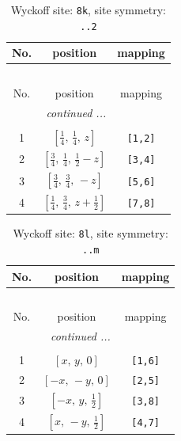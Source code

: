 \documentclass[fleqn,8pt]{jsarticle}
\begin{document}
\renewcommand{\arraystretch}{1.2}
\begin{longtable}{ccc}
\caption{Wyckoff site: {\tt 8k}, site symmetry: {\tt ..2}}
 \\
 \hline \hline
No. & position & mapping \\ \hline \endfirsthead

\multicolumn{2}{l}{\tablename\ \thetable{}} \\
 \hline \hline
No. & position & mapping \\ \hline \endhead

 \hline \hline
\multicolumn{2}{r}{\footnotesize\it continued ...} \\ \endfoot

 \hline \hline
\multicolumn{2}{r}{} \\ \endlastfoot

1 & $\left[ \frac{1}{4},\, \frac{1}{4},\, z \right]$ & {\tt [1,2]} \\ \hline
2 & $\left[ \frac{3}{4},\, \frac{1}{4},\, \frac{1}{2} - z \right]$ & {\tt [3,4]} \\ \hline
3 & $\left[ \frac{3}{4},\, \frac{3}{4},\, - z \right]$ & {\tt [5,6]} \\ \hline
4 & $\left[ \frac{1}{4},\, \frac{3}{4},\, z + \frac{1}{2} \right]$ & {\tt [7,8]} \\
\end{longtable}
\renewcommand{\arraystretch}{1.2}
\begin{longtable}{ccc}
\caption{Wyckoff site: {\tt 8l}, site symmetry: {\tt ..m}}
 \\
 \hline \hline
No. & position & mapping \\ \hline \endfirsthead

\multicolumn{2}{l}{\tablename\ \thetable{}} \\
 \hline \hline
No. & position & mapping \\ \hline \endhead

 \hline \hline
\multicolumn{2}{r}{\footnotesize\it continued ...} \\ \endfoot

 \hline \hline
\multicolumn{2}{r}{} \\ \endlastfoot

1 & $\left[ x,\, y,\, 0 \right]$ & {\tt [1,6]} \\ \hline
2 & $\left[ - x,\, - y,\, 0 \right]$ & {\tt [2,5]} \\ \hline
3 & $\left[ - x,\, y,\, \frac{1}{2} \right]$ & {\tt [3,8]} \\ \hline
4 & $\left[ x,\, - y,\, \frac{1}{2} \right]$ & {\tt [4,7]} \\
\end{longtable}
\end{document}
